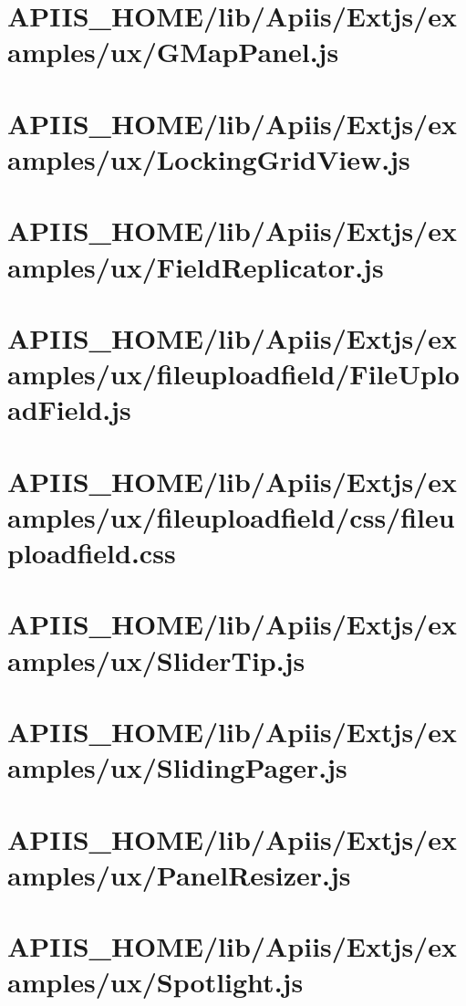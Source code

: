 \section{APIIS\_HOME/lib/Apiis/Extjs/examples/ux/GMapPanel.js} 
\section{APIIS\_HOME/lib/Apiis/Extjs/examples/ux/LockingGridView.js} 
\section{APIIS\_HOME/lib/Apiis/Extjs/examples/ux/FieldReplicator.js} 
\section{APIIS\_HOME/lib/Apiis/Extjs/examples/ux/fileuploadfield/FileUploadField.js} 
\section{APIIS\_HOME/lib/Apiis/Extjs/examples/ux/fileuploadfield/css/fileuploadfield.css} 
\section{APIIS\_HOME/lib/Apiis/Extjs/examples/ux/SliderTip.js} 
\section{APIIS\_HOME/lib/Apiis/Extjs/examples/ux/SlidingPager.js} 
\section{APIIS\_HOME/lib/Apiis/Extjs/examples/ux/PanelResizer.js} 
\section{APIIS\_HOME/lib/Apiis/Extjs/examples/ux/Spotlight.js} 
